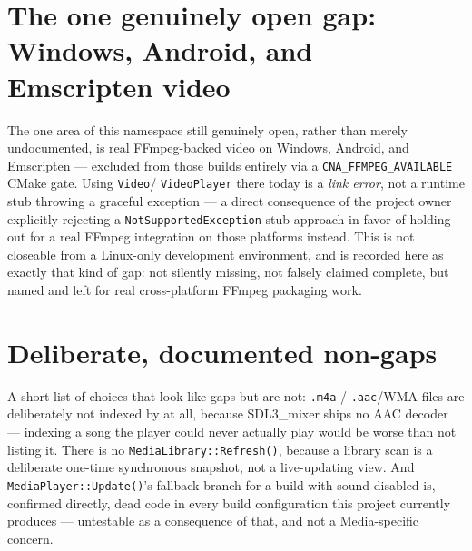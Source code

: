 \section{The one genuinely open gap: Windows, Android, and Emscripten video}

The one area of this namespace still genuinely open, rather than merely undocumented, is
real FFmpeg-backed video on Windows, Android, and Emscripten --- excluded from those builds
entirely via a \texttt{CNA\_FFMPEG\_AVAILABLE} CMake gate. Using \texttt{Video}/%
\texttt{VideoPlayer} there today is a \emph{link error}, not a runtime stub throwing a
graceful exception --- a direct consequence of the project owner explicitly rejecting a
\texttt{NotSupportedException}-stub approach in favor of holding out for a real FFmpeg
integration on those platforms instead. This is not closeable from a Linux-only development
environment, and is recorded here as exactly that kind of gap: not silently missing, not
falsely claimed complete, but named and left for real cross-platform FFmpeg packaging work.

\section{Deliberate, documented non-gaps}

A short list of choices that look like gaps but are not: \texttt{.m4a} / \texttt{.aac}/WMA
files are deliberately not indexed by  at all, because SDL3\_mixer
ships no AAC decoder --- indexing a song the player could never actually play would be worse
than not listing it. There is no \texttt{MediaLibrary::Refresh()}, because a library scan is
a deliberate one-time synchronous snapshot, not a live-updating view. And
\texttt{MediaPlayer::Update()}'s fallback branch for a build with sound disabled is,
confirmed directly, dead code in every build configuration this project currently produces
--- untestable as a consequence of that, and not a Media-specific concern.
